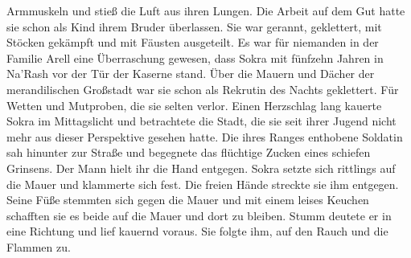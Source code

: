 Armmuskeln und stieß die Luft aus ihren Lungen. Die Arbeit auf dem Gut hatte sie schon als Kind 
ihrem Bruder überlassen. Sie war gerannt, geklettert, mit Stöcken gekämpft und mit Fäusten 
ausgeteilt. Es war für niemanden in der Familie Arell eine Überraschung gewesen, dass Sokra mit 
fünfzehn Jahren in Na'Rash vor der Tür der Kaserne stand. Über die Mauern und Dächer der 
merandilischen Großstadt war sie schon als Rekrutin des Nachts geklettert. Für Wetten und 
Mutproben, die sie selten verlor. Einen Herzschlag lang kauerte Sokra im Mittagslicht und 
betrachtete die Stadt, die sie seit ihrer Jugend nicht mehr aus dieser Perspektive gesehen hatte. 
Die ihres Ranges enthobene Soldatin sah hinunter zur Straße und begegnete das flüchtige Zucken 
eines schiefen Grinsens. Der Mann hielt ihr die Hand entgegen. Sokra setzte sich rittlings auf die 
Mauer und klammerte sich fest. Die freien Hände streckte sie ihm entgegen. Seine Füße stemmten sich 
gegen die Mauer und mit einem leises Keuchen schafften sie es beide auf die Mauer und dort zu 
bleiben. Stumm deutete er in eine Richtung und lief kauernd voraus. Sie folgte ihm, auf den Rauch 
und die Flammen zu.\\

